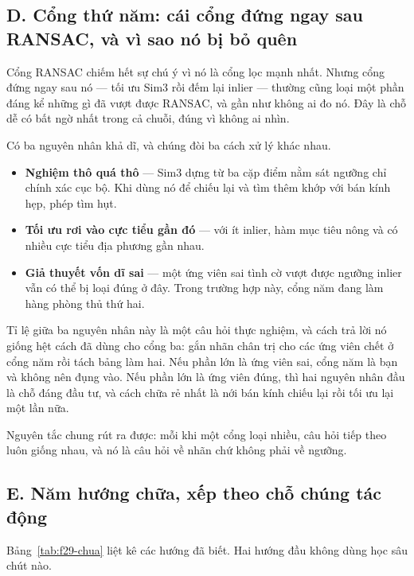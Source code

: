 \documentclass[../../deep_learning.tex]{subfiles}
\begin{document}
\subsection{D. Cổng thứ năm: cái cổng đứng ngay sau RANSAC, và vì sao nó bị bỏ quên}
Cổng RANSAC chiếm hết sự chú ý vì nó là cổng lọc mạnh nhất. Nhưng cổng đứng ngay sau nó --- tối ưu Sim3 rồi đếm lại inlier --- thường cũng loại một phần đáng kể những gì đã vượt được RANSAC, và gần như không ai đo nó. Đây là chỗ dễ có bất ngờ nhất trong cả chuỗi, đúng vì không ai nhìn.

Có ba nguyên nhân khả dĩ, và chúng đòi ba cách xử lý khác nhau.

\begin{itemize}
\item \textbf{Nghiệm thô quá thô} --- Sim3 dựng từ ba cặp điểm nằm sát ngưỡng chỉ chính xác cục bộ. Khi dùng nó để chiếu lại và tìm thêm khớp với bán kính hẹp, phép tìm hụt.
\item \textbf{Tối ưu rơi vào cực tiểu gần đó} --- với ít inlier, hàm mục tiêu nông và có nhiều cực tiểu địa phương gần nhau.
\item \textbf{Giả thuyết vốn dĩ sai} --- một ứng viên sai tình cờ vượt được ngưỡng inlier vẫn có thể bị loại đúng ở đây. Trong trường hợp này, cổng năm đang làm hàng phòng thủ thứ hai.
\end{itemize}

Tỉ lệ giữa ba nguyên nhân này là một câu hỏi thực nghiệm, và cách trả lời nó giống hệt cách đã dùng cho cổng ba: gắn nhãn chân trị cho các ứng viên chết ở cổng năm rồi tách bảng làm hai. Nếu phần lớn là ứng viên sai, cổng năm là bạn và không nên đụng vào. Nếu phần lớn là ứng viên đúng, thì hai nguyên nhân đầu là chỗ đáng đầu tư, và cách chữa rẻ nhất là nới bán kính chiếu lại rồi tối ưu lại một lần nữa.

Nguyên tắc chung rút ra được: mỗi khi một cổng loại nhiều, câu hỏi tiếp theo luôn giống nhau, và nó là câu hỏi về nhãn chứ không phải về ngưỡng.

\subsection{E. Năm hướng chữa, xếp theo chỗ chúng tác động}
Bảng~\ref{tab:f29-chua} liệt kê các hướng đã biết. Hai hướng đầu không dùng học sâu chút nào.
\end{document}
